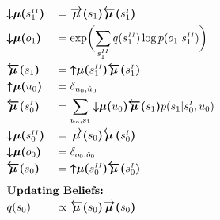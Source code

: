 \documentclass[fleqn]{article}
\begin{document}
\begin{minipage}[t]{0.5\textwidth}
    \begin{alignat}{2}
         & \bm{{\downarrow}{\mu}(}s^{\scriptscriptstyle II}_1\bm{)}  &  & = \bm{\overrightarrow{\mu}(}s_1\bm{)} \bm{\overleftarrow{\mu}(}s^{\scriptscriptstyle I}_1\bm{)}                                  \\
         & \bm{{\downarrow}{\mu}(}o_1\bm{)}                          &  & = \exp \biggl( \sum_{s^{\scriptscriptstyle II}_1} q(s^{\scriptscriptstyle II}_1) \log p(o_1|s^{\scriptscriptstyle II}_1) \biggr) \\
         & \bm{\overleftarrow{\mu}(}s_1\bm{)}                        &  & = \bm{{\uparrow}{\mu}(}s^{\scriptscriptstyle II}_1\bm{)} \bm{\overleftarrow{\mu}(}s^{\scriptscriptstyle I}_1\bm{)}               \\
         & \bm{{\uparrow}{\mu}(}u_0\bm{)}                            &  & = \delta_{u_0, \hat{u}_0}                                                                                                        \\
         & \bm{\overleftarrow{\mu}(}s^{\scriptscriptstyle I}_0\bm{)} &  & = \sum_{u_o, s_1} \bm{{\downarrow}{\mu}(}u_0\bm{)} \bm{\overleftarrow{\mu}(}s_1\bm{)} p(s_1|s^{\scriptscriptstyle I}_0,u_0)      \\
         & \bm{{\downarrow}{\mu}(}s^{\scriptscriptstyle II}_0\bm{)}  &  & = \bm{\overrightarrow{\mu}(}s_0\bm{)} \bm{\overleftarrow{\mu}(}s^{\scriptscriptstyle I}_0\bm{)}                                  \\
         & \bm{{\downarrow}{\mu}(}o_0\bm{)}                          &  & = \delta_{o_0, \hat{o}_0}                                                                                                        \\
         & \bm{\overleftarrow{\mu}(}s_0\bm{)}                        &  & = \bm{{\uparrow}{\mu}(}s^{\scriptscriptstyle II}_0\bm{)} \bm{\overleftarrow{\mu}(}s^{\scriptscriptstyle I}_0\bm{)}               \\[0.5em]
         & \rlap{\text{\bfseries Updating Beliefs:}} \nonumber                                                                                                                                             \\
         & q(s_0)                                                    &  & \propto \bm{\overleftarrow{\mu}(}s_0\bm{)} \bm{\overrightarrow{\mu}(}s_0\bm{)}                                                   \\

\end{alignat}
\end{minipage}
\end{document}
